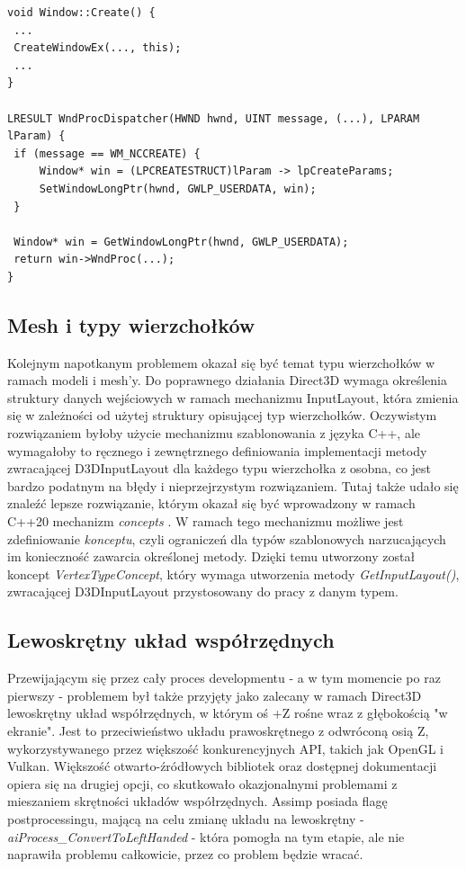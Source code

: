 \begin{lstlisting}[caption={Pseudokod integracji wskaźnika okna z uchwytem HWND}, label={lst:module:WndProcDispatcher}]
void Window::Create() {
 ...
 CreateWindowEx(..., this);
 ...
}

LRESULT WndProcDispatcher(HWND hwnd, UINT message, (...), LPARAM lParam) {
 if (message == WM_NCCREATE) {
     Window* win = (LPCREATESTRUCT)lParam -> lpCreateParams;
     SetWindowLongPtr(hwnd, GWLP_USERDATA, win);
 }
	
 Window* win = GetWindowLongPtr(hwnd, GWLP_USERDATA);
 return win->WndProc(...);
}
\end{lstlisting}

\subsection{Mesh i typy wierzchołków}
Kolejnym napotkanym problemem okazał się być temat typu wierzchołków w ramach modeli i mesh'y. Do poprawnego działania Direct3D wymaga określenia struktury danych wejściowych w ramach mechanizmu InputLayout, która zmienia się w zależności od użytej struktury opisującej typ wierzchołków. Oczywistym rozwiązaniem byłoby użycie mechanizmu szablonowania z języka C++, ale wymagałoby to ręcznego i zewnętrznego definiowania implementacji metody zwracającej D3DInputLayout dla każdego typu wierzchołka z osobna, co jest bardzo podatnym na błędy i nieprzejrzystym rozwiązaniem. Tutaj także udało się znaleźć lepsze rozwiązanie, którym okazał się być wprowadzony w ramach C++20 mechanizm \textit{concepts} \cite{cpp20:concepts:2025}. W ramach tego mechanizmu możliwe jest zdefiniowanie \textit{konceptu}, czyli ograniczeń dla typów szablonowych narzucających im konieczność zawarcia określonej metody. Dzięki temu utworzony został koncept \textit{VertexTypeConcept}, który wymaga utworzenia metody \textit{GetInputLayout()}, zwracającej D3DInputLayout przystosowany do pracy z danym typem.

\subsection{Lewoskrętny układ współrzędnych}
Przewijającym się przez cały proces developmentu - a w tym momencie po raz pierwszy - problemem był także przyjęty jako zalecany w ramach Direct3D lewoskrętny układ współrzędnych, w którym oś +Z rośne wraz z głębokością "w ekranie". Jest to przeciwieństwo układu prawoskrętnego z odwróconą osią Z, wykorzystywanego przez większość konkurencyjnych API, takich jak OpenGL i Vulkan. Większość otwarto-źródłowych bibliotek oraz dostępnej dokumentacji opiera się na drugiej opcji, co skutkowało okazjonalnymi problemami z mieszaniem skrętności układów współrzędnych. Assimp posiada flagę postprocessingu, mającą na celu zmianę układu na lewoskrętny - \textit{aiProcess\_ConvertToLeftHanded} - która pomogła na tym etapie, ale nie naprawiła problemu całkowicie, przez co problem będzie wracać.

